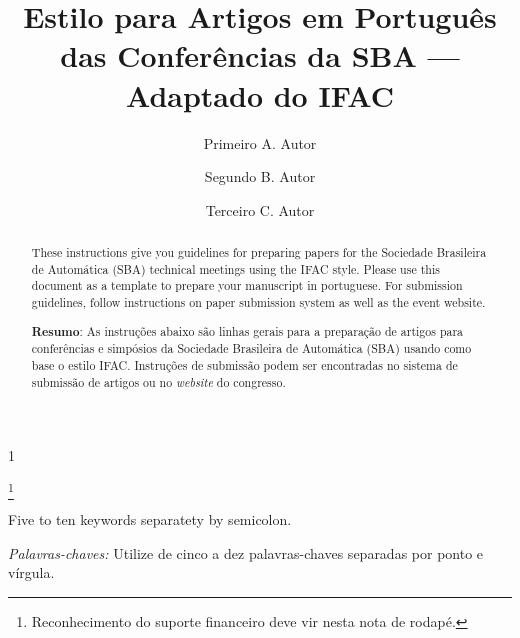 \documentclass[a4paper]{ifacconf}
\def\portugues{1}
\def\portugues{0}
\begin{document}
	
	
\if\portugues1

% 
	
\begin{frontmatter}

\title{Estilo para Artigos em Português das Conferências da SBA --- Adaptado do  IFAC} 

\thanks[footnoteinfo]{Reconhecimento do suporte financeiro deve vir nesta nota de rodapé.}


\author[First]{Primeiro A. Autor} 
\author[Second]{Segundo B. Autor} 
\author[Third]{Terceiro C. Autor}

\address[First]{Faculdade de Engenharia Elétrica, Universidade do Triângulo, MG, (e-mail: autor1@faceg@univt.br).}
\address[Second]{Faculdade de Engenharia de Controle \& Automação, Universidade do Futuro, RJ (e-mail: autor2@feca.unifutu.rj)}
\address[Third]{Electrical Engineering Department, 
   Seoul National University, Seoul, Korea, (e-mail: author3@snu.ac.kr)}


\renewcommand{\abstractname}{{\bf Abstract:~}}
\begin{abstract}                %
These instructions give you guidelines for preparing papers for the Sociedade Brasileira de Automática (SBA) technical meetings using the IFAC style. Please use this document as a template to prepare your manuscript in portuguese. For submission guidelines, follow instructions on paper submission system as well as the event website.

\vskip 1mm%
{\noindent \bf Resumo}:  As instruções abaixo são linhas gerais para a preparação de artigos para conferências e simpósios da Sociedade Brasileira de Automática (SBA) usando como base o estilo IFAC. Instruções de submissão podem ser encontradas no sistema de submissão de artigos ou no {\em website} do congresso.
\end{abstract}



\begin{keyword}
Five to ten keywords separatety by semicolon. 

\vskip 1mm%
{\noindent\it Palavras-chaves:} Utilize de cinco a dez palavras-chaves separadas por ponto e vírgula.
\end{keyword}




\end{frontmatter}
\end{document}
